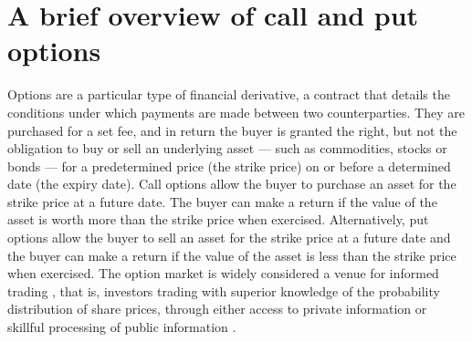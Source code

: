 \section{A brief overview of call and put options}

Options are a particular type of financial derivative, a contract that details the conditions under which payments are made between two counterparties. They are purchased for a set fee, and in return the buyer is granted the right, but not the obligation to buy or sell an underlying asset --- such as commodities, stocks or bonds --- for a predetermined price (the strike price) on or before a determined date (the expiry date).
\nline{}
Call options allow the buyer to purchase an asset for the strike price at a future date. The buyer can make a return if the value of the asset is worth more than the strike price when exercised. Alternatively, put options allow the buyer to sell an asset for the strike price at a future date and the buyer can make a return if the value of the asset is less than the strike price when exercised.
\nline{}
The option market is widely considered a venue for informed trading \cite{li2021effect,hu2014,chak2004}, that is, investors trading with superior knowledge of the probability distribution of share prices, through either access to private information or skillful processing of public information \cite{grossman1975application}. 

